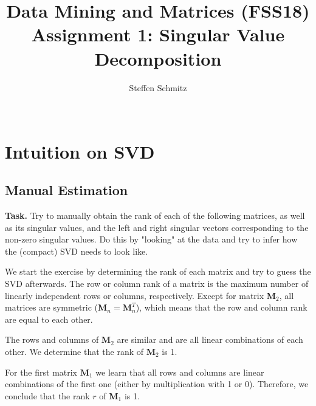 \documentclass{support/acm_proc_article-sp}
\begin{document}
    \title{Data Mining and Matrices (FSS18) \\ Assignment 1: Singular Value Decomposition}

    \author{
    \alignauthor
    Steffen Schmitz\\
    \\
    }

    \maketitle


    \section{Intuition on SVD}


    \subsection{Manual Estimation}
    \label{subsec:manest}

    \textbf{Task.} Try to manually obtain the rank of each of the following matrices, as well as its singular values,
    and the left and right singular vectors corresponding to the non-zero singular values.
    Do this by "looking" at the data and try to infer how the (compact) SVD needs to look like.

    We start the exercise by determining the rank of each matrix and try to guess the SVD afterwards.
    The row or column rank of a matrix is the maximum number of linearly independent rows or columns, respectively.
    Except for matrix $\mathbf{M}_2$, all matrices are symmetric ($\mathbf{M}_n = \mathbf{M}_n^T$), which means that
    the row and column rank are equal to each other.

    The rows and columns of $\mathbf{M}_2$ are similar and are all linear combinations of each other.
    We determine that the rank of $\mathbf{M}_2$ is 1.

    For the first matrix $\mathbf{M}_1$ we learn that all rows and columns
    are linear combinations of the first one (either by multiplication with 1 or 0).
    Therefore, we conclude that the rank $r$ of $\mathbf{M}_1$ is 1.
\end{document}
